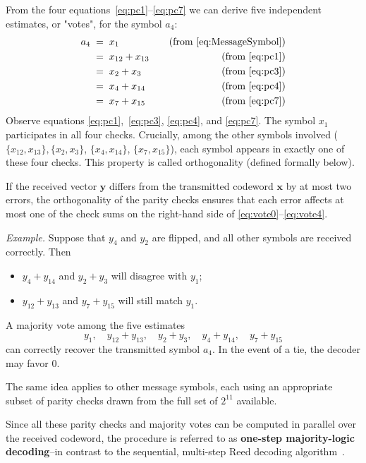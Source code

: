 \documentclass[conference,letterpaper]{IEEEtran}
\begin{document}
From the four equations~\eqref{eq:pc1}--\eqref{eq:pc7} we can derive five independent estimates, or "votes", for the symbol $a_4$:
\begin{align}
a_4 &\;=\; x_1 \quad &(\text{from } \eqref{eq:MessageSymbol}) \label{eq:vote0} \\
&\;=\; x_{12} + x_{13} \quad &(\text{from } \eqref{eq:pc1}) \label{eq:vote1} \\
&\;=\; x_{2} + x_{3} \quad &(\text{from } \eqref{eq:pc3}) \label{eq:vote2} \\
&\;=\; x_4 + x_{14} \quad &(\text{from } \eqref{eq:pc4}) \label{eq:vote3} \\
&\;=\; x_7 + x_{15} \quad &(\text{from } \eqref{eq:pc7}) \label{eq:vote4}
\end{align}
Observe equations \eqref{eq:pc1},~\eqref{eq:pc3}, \eqref{eq:pc4}, and \eqref{eq:pc7}. The symbol $x_1$ participates in all four checks. Crucially, among the other symbols involved ($\{x_{12}, x_{13}\}, \{x_{2}, x_{3}\}$, $\{x_4, x_{14}\}$, $\{x_7, x_{15}\}$), each symbol appears in exactly one of these four checks. This property is called orthogonality (defined formally below).

If the received vector $\boldsymbol{y}$ differs from the transmitted codeword $\boldsymbol{x}$ by at most two errors, the orthogonality of the parity checks ensures that each error affects at most one of the check sums on the right-hand side of \eqref{eq:vote0}–\eqref{eq:vote4}.

\medskip
\noindent
\textit{Example.} Suppose that $y_4$ and $y_2$ are flipped, and all other symbols are received correctly. Then
\begin{itemize}
  \item $y_4 + y_{14}$ and $y_2 + y_{3}$ will disagree with $y_1$;
  \item $y_{12} + y_{13}$ and $y_7 + y_{15}$ will still match $y_1$.
\end{itemize}

A majority vote among the five estimates 
\[
y_1,\quad y_{12} + y_{13},\quad y_2 + y_{3},\quad y_4 + y_{14},\quad y_7 + y_{15}
\]
can correctly recover the transmitted symbol $a_4$. In the event of a tie, the decoder may favor $0$.

The same idea applies to other message symbols, each using an appropriate subset of parity checks drawn from the full set of $2^{11}$ available.

Since all these parity checks and majority votes can be computed in parallel over the received codeword, the procedure is referred to as \textbf{one-step majority-logic decoding}--in contrast to the sequential, multi-step Reed decoding algorithm~\cite{Coding:books/PetersonW72}.
\end{document}
